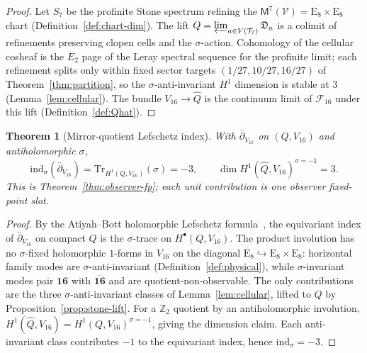 \documentclass[aps,prd,onecolumn,amsmath,amssymb,nofootinbib,11pt]{revtex4-2}
\numberwithin{equation}{section}
\theoremstyle{plain}
\newtheorem{theorem}{Theorem}[section]
\theoremstyle{definition}
\theoremstyle{remark}
\newcommand{\E}[1]{\mathrm{E}_{#1}}
\newcommand{\Void}{\mathcal{V}}
\newcommand{\Mirror}{\mathsf{M}}
\begin{document}
\begin{proof}
Let $S_7$ be the profinite Stone spectrum refining the
$\Mirror^7(\Void)=\E{8}\times\E{8}$ chart
(Definition~\ref{def:chart-dim}). The lift $Q=\varprojlim_{a\in V(\mathcal{T}_7)}\mathfrak{D}_a$
is a colimit of refinements preserving clopen cells and the $\sigma$-action.
Cohomology of the cellular cosheaf is the $E_2$ page of the Leray spectral
sequence for the profinite limit; each refinement splits only within fixed
sector targets $(1/27,10/27,16/27)$ of Theorem~\ref{thm:partition}, so the
$\sigma$-anti-invariant $H^1$ dimension is stable at $3$
(Lemma~\ref{lem:cellular}). The bundle $V_{16}\to\hat Q$ is the continuum
limit of $\mathcal{F}_{16}$ under this lift
(Definition~\ref{def:Qhat}).
\end{proof}

\begin{theorem}[Mirror-quotient Lefschetz index]\label{thm:mirror-index}
With $\bar\partial_{V_{16}}$ on $(Q,V_{16})$ and antiholomorphic $\sigma$,
\begin{equation}\label{eq:mirror-index}%
  \mathrm{ind}_\sigma(\bar\partial_{V_{16}})
  =\mathrm{Tr}_{H^1(Q,V_{16})}(\sigma)=-3,
  \qquad
  \dim H^1(\hat Q,V_{16})^{\sigma=-1}=3.
\end{equation}
This is Theorem~\ref{thm:observer-fp}; each unit contribution is one observer
fixed-point slot.
\end{theorem}

\begin{proof}
By the Atiyah--Bott holomorphic Lefschetz formula~\cite{AtiyahBott1966}, the
equivariant index of $\bar\partial_{V_{16}}$ on compact $Q$ is the
$\sigma$-trace on $H^\bullet(Q,V_{16})$. The product involution has no
$\sigma$-fixed holomorphic $1$-forms in $V_{16}$ on the diagonal
$\E{8}\hookrightarrow\E{8}\times\E{8}$: horizontal family modes are
$\sigma$-anti-invariant (Definition~\ref{def:physical}), while $\sigma$-invariant
modes pair $\mathbf{16}$ with $\overline{\mathbf{16}}$ and are
quotient-non-observable. The only contributions are the three
$\sigma$-anti-invariant classes of Lemma~\ref{lem:cellular}, lifted to $Q$ by
Proposition~\ref{prop:stone-lift}. For a $\mathbb{Z}_2$ quotient by an
antiholomorphic involution,
$H^1(\hat Q,V_{16})=H^1(Q,V_{16})^{\sigma=-1}$, giving the dimension claim.
Each anti-invariant class contributes $-1$ to the equivariant index, hence
$\mathrm{ind}_\sigma=-3$.
\end{proof}
\end{document}
